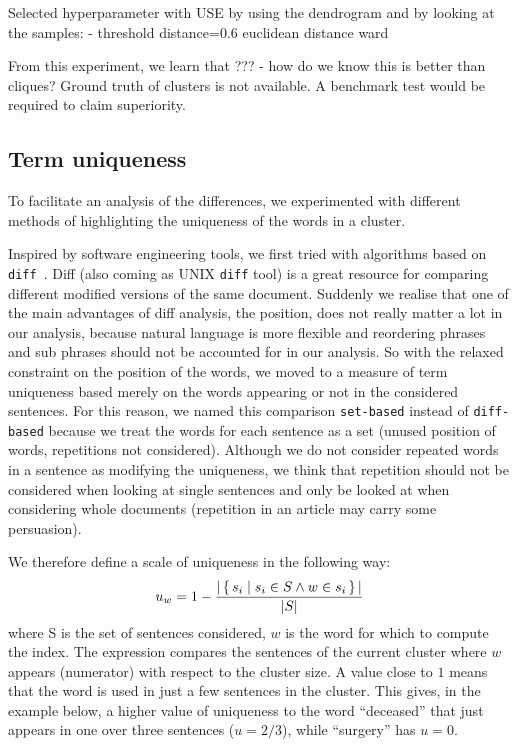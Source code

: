 
Selected hyperparameter with USE by using the dendrogram and by looking at the samples:
- threshold distance=0.6 euclidean distance ward

From this experiment, we learn that ???
- how do we know this is better than cliques? Ground truth of clusters is not available. A benchmark test would be required to claim superiority.

\subsection{Term uniqueness}
\label{sec:cgs_clustering_and_differences_uniquenesss}


To facilitate an analysis of the differences, we experimented with different methods of highlighting the uniqueness of the words in a cluster.

Inspired by software engineering tools, we first tried with algorithms based on \texttt{diff}~\citep{myers1986ano}. Diff (also coming as UNIX \texttt{diff} tool) is a great resource for comparing different modified versions of the same document.
Suddenly we realise that one of the main advantages of diff analysis, the position, does not really matter a lot in our analysis, because natural language is more flexible and reordering phrases and sub phrases should not be accounted for in our analysis. So with the relaxed constraint on the position of the words, we moved to a measure of term uniqueness based merely on the words appearing or not in the considered sentences. For this reason, we named this comparison \texttt{set-based} instead of \texttt{diff-based} because we treat the words for each sentence as a set (unused position of words, repetitions not considered). Although we do not consider repeated words in a sentence as modifying the uniqueness, we think that repetition should not be considered when looking at single sentences and only be looked at when considering whole documents (repetition in an article may carry some persuasion).

We therefore define a scale of uniqueness in the following way:
$$u_w = 1 - \frac{|\set{s_i | s_i \in S \land w \in s_i}|}{|S|}$$
where S is the set of sentences considered, $w$ is the word for which to compute the index. The expression compares the sentences of the current cluster where $w$ appears (numerator) with respect to the cluster size.
A value close to $1$ means that the word is used in just a few sentences in the cluster.
This gives, in the example below, a higher value of uniqueness to the word ``deceased'' that just appears in one over three sentences ($u = 2/3$), while ``surgery'' has $u = 0$.

